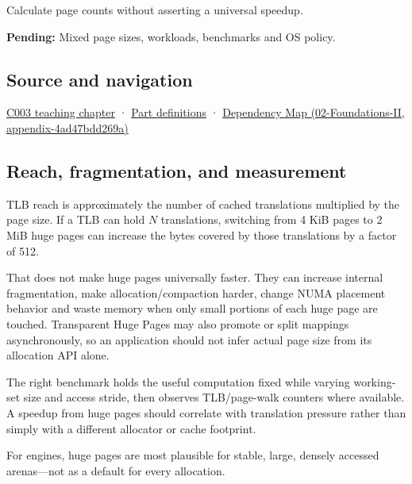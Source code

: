 Calculate page counts without asserting a universal speedup.

\textbf{Pending:} Mixed page sizes, workloads, benchmarks and OS policy.

\subsection{Source and navigation}\label{appendix-ce688d1acdab-source-and-navigation}

\hyperref[01-foundations-i-ch002-where-the-bytes-live]{C003 teaching chapter} · \hyperref[appendix-fd090d982a15-m003---parts-41-60]{Part definitions} · \href{../02-Foundations-II/main.pdf\#nameddest=appendix-4ad47bdd269a}{Dependency Map (02-Foundations-II, appendix-4ad47bdd269a)}

\subsection{Reach, fragmentation, and measurement}\label{appendix-ce688d1acdab-reach-fragmentation-and-measurement}

TLB reach is approximately the number of cached translations multiplied by the page size. If a TLB can hold \(N\) translations, switching from 4 KiB pages to 2 MiB huge pages can increase the bytes covered by those translations by a factor of 512.

That does not make huge pages universally faster. They can increase internal fragmentation, make allocation/compaction harder, change NUMA placement behavior and waste memory when only small portions of each huge page are touched. Transparent Huge Pages may also promote or split mappings asynchronously, so an application should not infer actual page size from its allocation API alone.

The right benchmark holds the useful computation fixed while varying working-set size and access stride, then observes TLB/page-walk counters where available. A speedup from huge pages should correlate with translation pressure rather than simply with a different allocator or cache footprint.

For engines, huge pages are most plausible for stable, large, densely accessed arenas---not as a default for every allocation.
